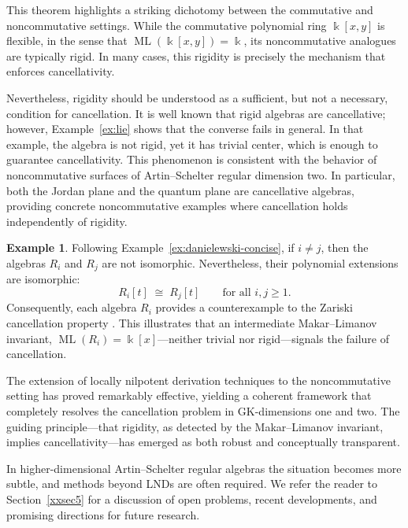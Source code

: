 \documentclass{amsart}
\theoremstyle{plain}
\numberwithin{theorem}{section}
\numberwithin{equation}{theorem}
\theoremstyle{definition}
\newtheorem{example}[theorem]{Example}
\DeclareMathOperator{\ML}{ML}
\begin{document}
This theorem highlights a striking dichotomy between the commutative and
noncommutative settings. While the commutative polynomial ring
$\Bbbk[x,y]$ is flexible, in the sense that $\ML(\Bbbk[x,y])=\Bbbk$,
its noncommutative analogues are typically rigid. In many cases, this
rigidity is precisely the mechanism that enforces cancellativity.

Nevertheless, rigidity should be understood as a sufficient, but not a
necessary, condition for cancellation. It is well known that rigid
algebras are cancellative; however, Example~\ref{ex:lie} shows that the
converse fails in general. In that example, the algebra is not rigid,
yet it has trivial center, which is enough to guarantee cancellativity.
This phenomenon is consistent with the behavior of noncommutative
surfaces of Artin--Schelter regular dimension two. In particular, both
the Jordan plane and the quantum plane are cancellative algebras,
providing concrete noncommutative examples where cancellation holds
independently of rigidity.

\begin{example}
Following Example~\ref{ex:danielewski-concise}, if $i \neq j$, then the
algebras $R_i$ and $R_j$ are not isomorphic. Nevertheless, their
polynomial extensions are isomorphic:
\[
R_i[t] \;\cong\; R_j[t] \qquad \text{for all } i,j \geq 1.
\]
Consequently, each algebra $R_i$ provides a counterexample to the
Zariski cancellation property \cite{Da, Crachiola2009}. This illustrates
that an intermediate Makar--Limanov invariant,
$\ML(R_i)=\Bbbk[x]$—neither trivial nor rigid—signals the failure of
cancellation.
\end{example}

The extension of locally nilpotent derivation techniques to the
noncommutative setting has proved remarkably effective, yielding a
coherent framework that completely resolves the cancellation problem
in GK-dimensions one and two. The guiding principle—that rigidity, as
detected by the Makar--Limanov invariant, implies cancellativity—has
emerged as both robust and conceptually transparent.

In higher-dimensional Artin--Schelter regular algebras the situation
becomes more subtle, and methods beyond LNDs are often required. We
refer the reader to Section~\ref{xxsec5} for a discussion of open
problems, recent developments, and promising directions for future
research.



\end{document}
